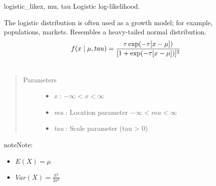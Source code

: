 \hypertarget{pymc.distributions.logistic_like}{}\begin{funcdesc}{logistic\_like}{x, mu, tau}
Logistic log-likelihood.

The logistic distribution is often used as a growth model; for example,
populations, markets. Resembles a heavy-tailed normal distribution.
\begin{gather}
\begin{split}f(x \mid \mu, tau) = \frac{\tau \exp(-\tau[x-\mu])}{[1 + \exp(-\tau[x-\mu])]^2}\end{split}\notag\\\begin{split}\end{split}\notag
\end{gather}\begin{quote}\begin{description}
\item[Parameters] \leavevmode\begin{itemize}
\item {} 
\emph{x} : $-\infty < x < \infty$

\item {} 
\emph{mu} : Location parameter $-\infty < mu < \infty$

\item {} 
\emph{tau} : Scale parameter (tau \textgreater{} 0)

\end{itemize}

\end{description}\end{quote}

\begin{notice}{note}{Note:}\begin{itemize}
\item {} 
$E(X) = \mu$

\item {} 
$Var(X) = \frac{\pi^2}{3\tau^2}$

\end{itemize}
\end{notice}
\end{funcdesc}

